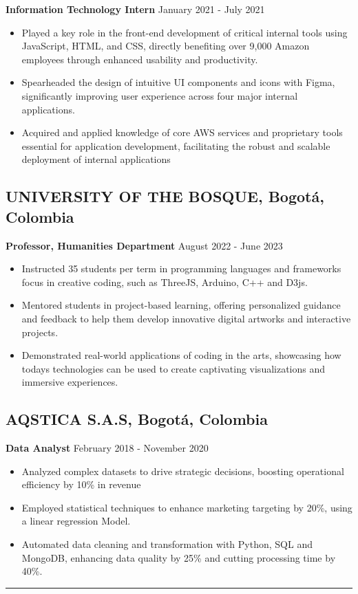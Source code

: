 \documentclass[10pt,a4paper]{article}
\begin{document}
\textbf{Information Technology Intern} \hfill January 2021 - July 2021
\begin{itemize}[noitemsep]
    \item Played a key role in the front-end development of critical internal tools using JavaScript, HTML, and CSS, directly benefiting over 9,000 Amazon employees through enhanced usability and productivity.
    \item Spearheaded the design of intuitive UI components and icons with Figma, significantly improving user experience across four major internal applications.
    \item Acquired and applied knowledge of core AWS services and proprietary tools essential for application development, facilitating the robust and scalable deployment of internal applications
\end{itemize}

\subsection*{UNIVERSITY OF THE BOSQUE, Bogotá, Colombia}
\textbf{Professor, Humanities Department} \hfill August 2022 - June 2023
\begin{itemize}[noitemsep]
    \item Instructed 35 students per term in programming languages and frameworks focus in creative coding, such as ThreeJS, Arduino, C++ and D3js.
    \item Mentored students in project-based learning, offering personalized guidance and feedback to help them develop innovative digital artworks and interactive projects.
    \item Demonstrated real-world applications of coding in the arts, showcasing how todays technologies can be used to create captivating visualizations and immersive experiences.
\end{itemize}

\subsection*{AQSTICA S.A.S, Bogotá, Colombia}
\textbf{Data Analyst} \hfill February 2018 - November 2020
\begin{itemize}[noitemsep]
    \item Analyzed complex datasets to drive strategic decisions, boosting operational efficiency by 10\% in revenue
    \item Employed statistical techniques to enhance marketing targeting by 20\%, using a linear regression Model.
    \item Automated data cleaning and transformation with Python, SQL and MongoDB, enhancing data quality by 25\% and cutting processing time by 40\%.
\end{itemize}
\rule{\textwidth}{0.4pt} 
\end{document}
